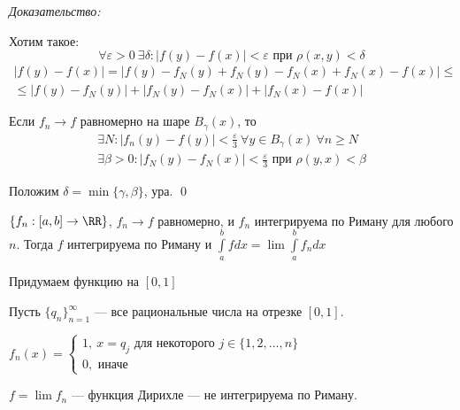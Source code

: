 \textit{Доказательство:}

Хотим такое:
\[
    \forall \varepsilon > 0 \ \exists \delta : | f(y) - f(x) | < \varepsilon \text{ при } \rho(x, y) < \delta
\]
\begin{gather*}
    |f(y) - f(x)|
    =
    |f(y) - f_N(y) + f_N(y) - f_N(x) + f_N(x) - f(x)|
    \leq
    \\
    \leq
    |f(y) - f_N(y)| + |f_N(y) - f_N(x)| + |f_N(x) - f(x)|
\end{gather*}

Если \( f_n \to f \) равномерно на шаре \( B_\gamma(x) \), то
\begin{gather*}
    \exists N : | f_n(y) - f(y) | < \frac{\varepsilon}{3} \ \forall y \in B_\gamma (x) \ \forall n \geq N
    \\
    \exists \beta > 0 : | f_N (y) - f_N (x) | < \frac{\varepsilon}{3} \text{ при } \rho(y, x) < \beta
\end{gather*}

Положим \( \delta = \min \{ \gamma, \beta \} \), ура.
\qed

\begin{assrt}{}{}
    \( \{ f_n : [a, b] \to \RR \} \), \( f_n \to f \) равномерно, и \( f_n \) интегрируема
    по Риману для любого \( n \).
    Тогда \( f \) интегрируема по Риману и \( \int\limits_{a}^{b} f dx = \lim \int\limits_{a}^{b} f_n dx \)
\end{assrt}

\begin{example}{}{}
    Придумаем функцию на \( [0, 1] \)

    Пусть \( \{ q_n \}_{n = 1}^{\infty} \) --- все рациональные числа на отрезке \( [0, 1] \).

    \(
        f_n (x) = \begin{cases}
            1, \ x = q_j \text{ для некоторого } j \in \{ 1, 2, \ldots, n \}
            \\
            0, \text{ иначе}
        \end{cases}
    \)

    \( f = \lim f_n \) --- функция Дирихле --- не интегрируема по Риману.
\end{example}
